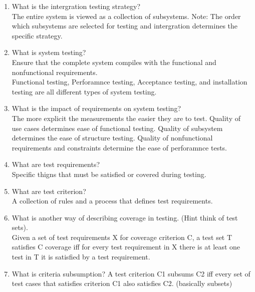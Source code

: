 \documentclass[10pt]{article}
\begin{document}
\begin{enumerate}
    \item What is the intergration testing strategy?\\
          The entire system is viewed as a collection of subsystems. Note: The order which subsystems are selected for testing and intergration determines the specific strategy.\\


    \item What is system testing?\\
          Ensure that the complete system compiles with the functional and nonfunctional requirements.\\
          Functional testing, Perforamnce testing, Acceptance testing, and installation testing are all different types of system testing.\\

    \item What is the impact of requirements on system testing?\\
          The more explicit the measurements the easier they are to test. Quality of use cases determines ease of functional testing. Quality of subsystem determines the ease of structure testing.
          Quality of nonfunctional requirements and constraints determine the ease of perforamnce tests.\\

    \item What are test requirements?\\
          Specific thigns that must be satisfied or covered during testing.\\

    \item What are test criterion?\\
          A collection of rules and a process that defines test requirements.\\

    \item What is another way of describing coverage in testing. (Hint think of test sets).\\
          Given a set of test requirements X for coverage criterion C, a test set T satisfies C coverage iff for every test requirement in X there is at least one test in T it is satisfied by a test requirement.\\

    \item What is criteria subsumption?
          A test criterion C1 subsums C2 iff every set of test cases that satisfies criterion C1 also satisfies C2. (basically subsets)\\


\end{enumerate}
\end{document}
